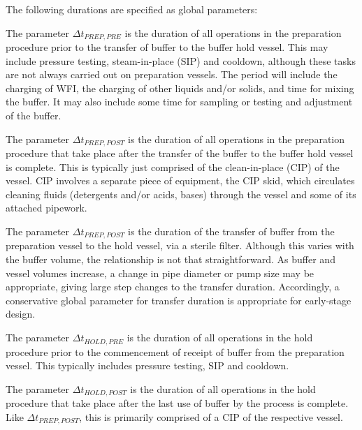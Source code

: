 The following durations are specified as global parameters:

The parameter $\Delta t_{\mathit{PREP,PRE}}$ is the duration of all operations
in the preparation procedure prior to the transfer of buffer to the buffer hold
vessel.  
This may include pressure testing, steam-in-place (SIP) and cooldown, although
these tasks are not always carried out on preparation vessels.
The period will include the charging of WFI, the charging of other liquids
and/or solids, and time for mixing the buffer.
It may also include some time for sampling or testing and adjustment of the
buffer.

The parameter $\Delta t_{\mathit{PREP,POST}}$ is the duration of all operations
in the preparation procedure that take place after the transfer of the buffer
to the buffer hold vessel is complete.
This is typically just comprised of the clean-in-place (CIP) of the vessel.
CIP involves a separate piece of equipment, the CIP skid, which circulates
cleaning fluids (detergents and/or acids, bases) through the vessel and some of
its attached pipework.

The parameter $\Delta t_{\mathit{PREP,POST}}$ is the duration of the transfer
of buffer from the preparation vessel to the hold vessel, via a sterile filter.
Although this varies with the buffer volume, the relationship is not that
straightforward.
As buffer and vessel volumes increase, a change in pipe diameter or pump size
may be appropriate, giving large step changes to the transfer duration.
Accordingly, a conservative global parameter for transfer duration is
appropriate for early-stage design.

The parameter $\Delta t_{\mathit{HOLD,PRE}}$ is the duration of all operations
in the hold procedure prior to the commencement of receipt of buffer from the
preparation vessel.
This typically includes pressure testing, SIP and cooldown.

The parameter $\Delta t_{\mathit{HOLD,POST}}$ is the duration of all operations
in the hold procedure that take place after the last use of buffer by the
process is complete.
Like $\Delta t_{\mathit{PREP,POST}}$, this is primarily comprised of a CIP of
the respective vessel.

